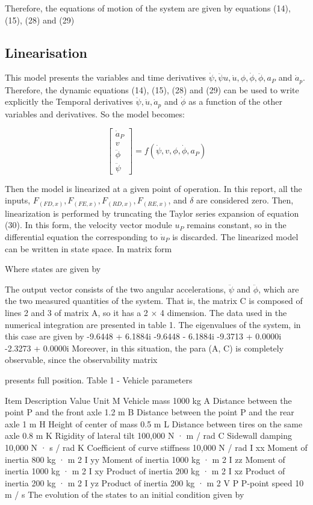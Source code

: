 \documentclass[sublist,a4paper,twoside,11pt]{article}
\begin{document}
Therefore, the equations of motion of the system are given by equations (14), (15), (28) and (29)

\subsection{Linearisation}
This model presents the variables and time derivatives $\dot{\psi} ,\ddot{\psi} u,\dot{u}, \phi,\dot{\phi},\ddot{\phi},a_P$  and $\dot{a}_p$.  Therefore, the dynamic equations (14), (15), (28) and (29) can be used to write explicitly the Temporal derivatives $\ddot{\psi}, \dot{u}, \dot{a}_p$ and $\dot{\phi}$ as a function of the other variables and derivatives. So the model becomes:

\begin{equation}
\begin{bmatrix} 
	\dot{a}_P   \\ 
	v       \\ 
	\ddot{\phi} \\ 
	\ddot{\psi} 
\end{bmatrix}
=f( \dot{\psi},v,\phi,\dot{\phi}, a_P )     
\end{equation}


Then the model is linearized at a given point of operation. In this report, all the inputs, $F_(FD,x), F_(FE,x), F_(RD,x), F_(RE,x)$, and $\delta$ are considered zero. Then, linearization is performed by truncating the Taylor series expansion of equation (30). In this form, the velocity vector module $u_P$ remains constant, so in the differential equation the corresponding to $\dot{u}_P$ is discarded.
The linearized model can be written in state space. In matrix form

Where states are given by

The output vector consists of the two angular accelerations, $\ddot{\psi}$ and $\ddot{\phi}$, which are the two measured quantities of the system. That is, the matrix C is composed of lines 2 and 3 of matrix A, so it has a 2 × 4 dimension.
The data used in the numerical integration are presented in table 1. The eigenvalues of the system, in this case are given by
-9.6448 + 6.1884i
-9.6448 - 6.1884i
-9.3713 + 0.0000i
-2.3273 + 0.0000i
Moreover, in this situation, the para (A, C) is completely observable, since the observability matrix

presents full position.
Table 1 - Vehicle parameters

Item Description Value Unit
M Vehicle mass 1000 kg
A Distance between the point P and the front axle 1.2 m
B Distance between the point P and the rear axle 1 m
H Height of center of mass 0.5 m
L Distance between tires on the same axle 0.8 m
K Rigidity of lateral tilt 100,000 N · m / rad
C Sidewall damping 10,000 N · s / rad
K Coefficient of curve stiffness 10,000 N / rad
I xx Moment of inertia 800 kg · m 2
I yy Moment of inertia 1000 kg · m 2
I zz Moment of inertia 1000 kg · m 2
I xy Product of inertia 200 kg · m 2
I xz Product of inertia 200 kg · m 2
I yz Product of inertia 200 kg · m 2
V P P-point speed 10 m / s
The evolution of the states to an initial condition given by
\end{document}
